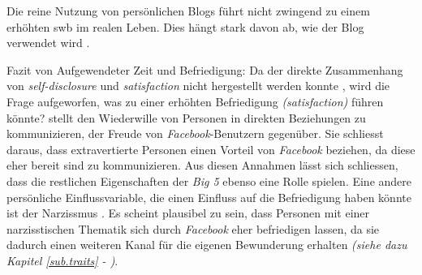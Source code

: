 Die reine Nutzung von persönlichen Blogs führt nicht zwingend zu einem erhöhten \gls{swb} im realen Leben. Dies hängt stark davon ab, wie der Blog verwendet wird \cite{Jung:2012}.\par 
Fazit von Aufgewendeter Zeit und Befriedigung: \newline
Da der direkte Zusammenhang von \textit{self-disclosure} und \textit{satisfaction} nicht hergestellt werden konnte \cite{Special:2012}, wird die Frage aufgeworfen, was zu einer erhöhten Befriedigung \textit{(satisfaction)} führen könnte?  stellt den Wiederwille von Personen in direkten Beziehungen zu kommunizieren, der Freude von \textit{Facebook}-Benutzern gegenüber. Sie schliesst daraus, dass extravertierte Personen einen Vorteil von \textit{Facebook} beziehen, da diese eher bereit sind zu kommunizieren. Aus diesen Annahmen lässt sich schliessen, dass die restlichen Eigenschaften der \textit{Big 5} ebenso eine Rolle spielen.\newline
Eine andere persönliche Einflussvariable, die einen Einfluss auf die Befriedigung haben könnte ist der Narzissmus \cite{Special:2012}. Es scheint plausibel zu sein, dass Personen mit einer narzisstischen Thematik sich durch \textit{Facebook} eher befriedigen lassen, da sie dadurch einen weiteren Kanal für die eigenen Bewunderung erhalten \textit{(siehe dazu Kapitel \ref{sub.traits} - )}.\par 

